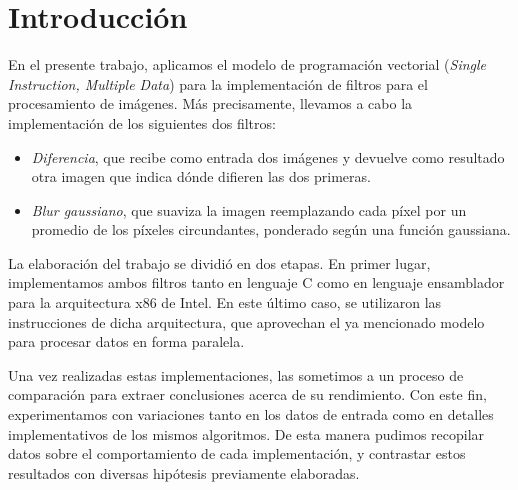 \section{Introducción}

  En el presente trabajo, aplicamos el modelo de programación vectorial  (\emph{Single Instruction, Multiple Data}) para la implementación de filtros para el procesamiento de imágenes. Más precisamente, llevamos a cabo la implementación de los siguientes dos filtros:
  \begin{itemize}
    \item \emph{Diferencia}, que recibe como entrada dos imágenes y devuelve como resultado otra imagen que indica dónde difieren las dos primeras.
    \item \emph{Blur gaussiano}, que suaviza la imagen reemplazando cada píxel por un promedio de los píxeles circundantes, ponderado según una función gaussiana.
  \end{itemize}

  La elaboración del trabajo se dividió en dos etapas. En primer lugar, implementamos ambos filtros tanto en lenguaje C como en lenguaje ensamblador para la arquitectura x86 de Intel. En este último caso, se utilizaron las instrucciones  de dicha arquitectura, que aprovechan el ya mencionado modelo  para procesar datos en forma paralela.

  Una vez realizadas estas implementaciones, las sometimos a un proceso de comparación para extraer conclusiones acerca de su rendimiento. Con este fin, experimentamos con variaciones tanto en los datos de entrada como en detalles implementativos de los mismos algoritmos. De esta manera pudimos recopilar datos sobre el comportamiento de cada implementación, y contrastar estos resultados con diversas hipótesis previamente elaboradas.
